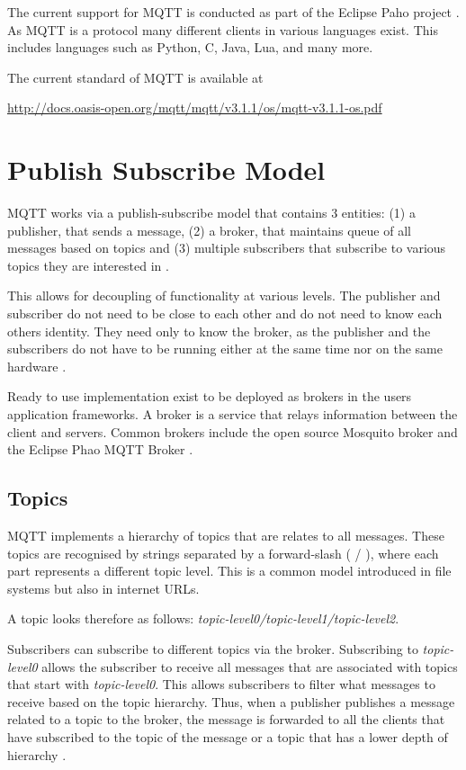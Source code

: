The current support for MQTT is conducted as part of the Eclipse Paho
project \cite{eclipse-mosquitto}.  As MQTT is a protocol many
different clients in various languages exist.  This includes languages
such as Python, C, Java, Lua, and many more.

The current standard of MQTT is available at 

\url{http://docs.oasis-open.org/mqtt/mqtt/v3.1.1/os/mqtt-v3.1.1-os.pdf}

\section{Publish Subscribe Model}

MQTT works via a publish-subscribe model that contains 3 entities: (1) a
publisher, that sends a message, (2) a broker, that maintains queue of all
messages based on topics and (3) multiple subscribers that subscribe to
various topics they are interested in \cite{how-mqtt-works}.

This allows for decoupling of functionality at various levels. The
publisher and subscriber do not need to be close to each other and do
not need to know each others identity. They need only to know the
broker, as the publisher and the subscribers do not have to be running
either at the same time nor on the same hardware
\cite{hivemq-details}.

Ready to use implementation exist to be deployed as brokers in the
users application frameworks. A broker is a service that relays
information between the client and servers. Common brokers include the
open source Mosquito broker \cite{mqtt-official} and the Eclipse Phao
MQTT Broker \cite{eclipse-mosquitto}.


\subsection{Topics}

MQTT implements a hierarchy of topics that are relates
to all messages. These topics are recognised by strings separated by a
forward-slash ( / ), where each part represents a different topic
level. This is a common model introduced in file systems but also in
internet URLs. 

A topic looks therefore as follows: \textit{topic-level0/topic-level1/topic-level2}.



Subscribers can subscribe to different topics via the broker.
Subscribing to \textit{topic-level0} allows the subscriber to receive all
messages that are associated with topics that start with {\em
  topic-level0}. This allows subscribers to filter what messages to
receive based on the topic hierarchy. Thus, when a publisher publishes
a message related to a topic to the broker, the message is forwarded
to all the clients that have subscribed to the topic of the message or
a topic that has a lower depth of hierarchy \cite{hivemq-details}
\cite{how-mqtt-works}.


